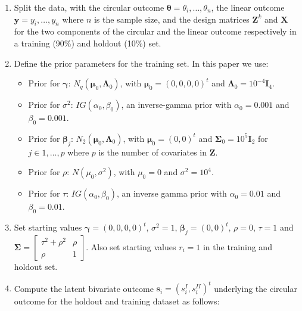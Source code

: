 \documentclass[11pt,]{article}
\begin{document}
\begin{appendices}
\begin{enumerate}

\item Split the data, with the circular outcome $\boldsymbol{\theta} = \theta_i, \dots, \theta_n$, the linear outcome $\boldsymbol{y} = y_i, \dots, y_n$ where $n$ is the sample size, and the design matrices $\boldsymbol{Z}^k$ and $\boldsymbol{X}$ for the two components of the circular and the linear outcome respectively in a training (90\%) and holdout (10\%) set.

\item Define the prior parameters for the training set. In this paper we use:

\begin{itemize}
\item Prior for $\boldsymbol{\gamma}$: $N_q(\boldsymbol{\mu}_{0}, \boldsymbol{\Lambda}_{0})$, with $\boldsymbol{\mu}_{0} = (0,0,0,0)^t$ and $\boldsymbol{\Lambda}_{0} = 10^{-4}\boldsymbol{I}_4$.
\item Prior for $\sigma^2$: $IG(\alpha_{0}, \beta_{0})$, an inverse-gamma prior with $\alpha_{0} = 0.001$ and $\beta_{0} = 0.001$.
\item Prior for $\boldsymbol{\beta}_{j}$: $N_2(\boldsymbol{\mu}_{0}, \boldsymbol{\Lambda}_0)$, with $\boldsymbol{\mu}_{0} = (0,0)^t$ and  $\boldsymbol{\Sigma}_{0} = 10^{5}\boldsymbol{I}_2$ for $j \in 1, \dots, p$ where $p$ is the number of covariates in $\boldsymbol{Z}$.
\item Prior for $\rho$: $N(\mu_0, \sigma^2)$, with $\mu_0 = 0$ and $\sigma^2 = 10^{4}$.
\item Prior for $\tau$: $IG(\alpha_{0}, \beta_{0})$, an inverse gamma prior with $\alpha_{0} = 0.01$ and $\beta_{0} = 0.01$.
\end{itemize}


\item Set starting values $\boldsymbol{\gamma} = (0,0,0,0)^t$, $\sigma^2 = 1$, $\boldsymbol{\beta}_j = (0,0)^t$, $\rho = 0$, $\tau = 1$ and $\boldsymbol{\Sigma} = \begin{bmatrix} \tau^2 + \rho^2 & \rho\\ \rho & 1 \end{bmatrix}$. Also set starting values $r_i = 1$ in the training and holdout set. 

\item Compute the latent bivariate outcome $\boldsymbol{s}_i = (s_i^{I}, s_i^{II})^t$ underlying the circular outcome for the holdout and training dataset as follows:


\end{enumerate}
\end{appendices}
\end{document}
